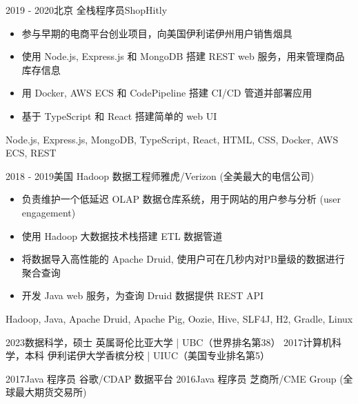 \documentclass[alternative]{resume_template}
\begin{document}
\begin{experiences}
    \experience
    {2019 - 2020}{北京}
    {全栈程序员}{ShopHitly}
    {
        \begin{itemize}
            \item 参与早期的电商平台创业项目，向美国伊利诺伊州用户销售烟具
            \item 使用 Node.js, Express.js 和 MongoDB 搭建 REST web 服务，用来管理商品库存信息
            \item 用 Docker, AWS ECS 和 CodePipeline 搭建 CI/CD 管道并部署应用
            \item 基于 TypeScript 和 React 搭建简单的 web UI
        \end{itemize}
    }
    {Node.js, Express.js, MongoDB, TypeScript, React, HTML, CSS, Docker, AWS ECS, REST}

    \experience
    {2018 - 2019}{美国}
    {Hadoop 数据工程师}{雅虎/Verizon (全美最大的电信公司)}
    {
        \begin{itemize}
            \item 负责维护一个低延迟 OLAP 数据仓库系统，用于网站的用户参与分析 (user engagement)
            \item 使用 Hadoop 大数据技术栈搭建 ETL 数据管道
            \item 将数据导入高性能的 Apache Druid, 使用户可在几秒内对PB量级的数据进行聚合查询
            \item 开发 Java web 服务，为查询 Druid 数据提供 REST API
        \end{itemize}
    }
    {Hadoop, Java, Apache Druid, Apache Pig, Oozie, Hive, SLF4J, H2, Gradle, Linux}

\end{experiences}

\twocolumnsection
{
    \begin{internships}
        \internship
        {2023}{数据科学，硕士}
        {英属哥伦比亚大学 | UBC（世界排名第38）}
        \vspace{5pt}
        \internship
        {2017}{计算机科学，本科}
        {伊利诺伊大学香槟分校 | UIUC（美国专业排名第5）}
    \end{internships}
}
{
    \begin{internships}
        \internship
        {2017}{Java 程序员}
        {谷歌/CDAP 数据平台}
        \vspace{5pt}
        \internship
        {2016}{Java 程序员}
        {芝商所/CME Group (全球最大期货交易所)}
    \end{internships}
}
\end{document}
